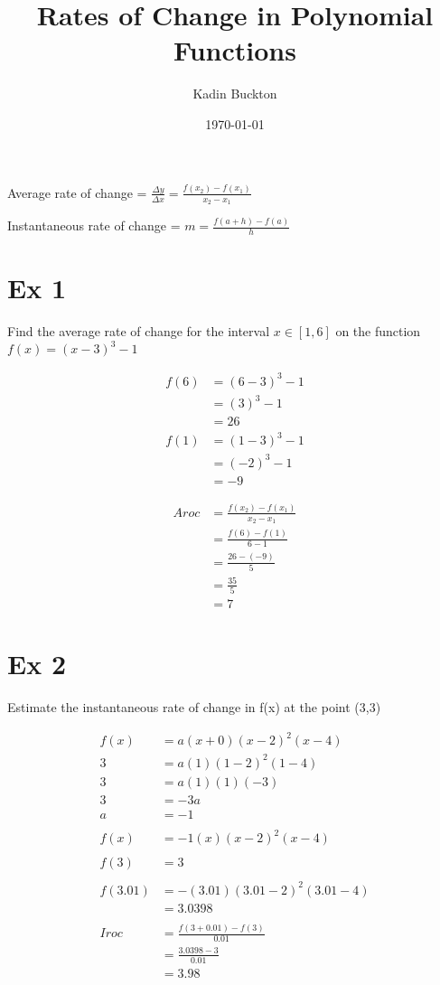 \documentclass[11pt]{article}
\author{Kadin Buckton}
\date{\today}
\title{Rates of Change in Polynomial Functions}
\begin{document}
\maketitle
Average rate of change = \(\frac{\Delta y}{\Delta x} = \frac{f(x_2)-f(x_1)}{x_2-x_1}\)

Instantaneous rate of change = \(m = \frac{f(a+h)-f(a)}{h}\)
\section*{Ex 1}
\label{sec:org9ae3475}

Find the average rate of change for the interval \(x \in [1,6]\) on the function \(f(x) = (x-3)^3-1\)

\begin{align*}
f(6) &= (6-3)^3-1\\
&=(3)^3-1\\
&=26\\
f(1) &= (1-3)^3-1\\
&= (-2)^3-1\\
&=-9
\end{align*}

\begin{align*}
Aroc &= \frac{f(x_2)-f(x_1)}{x_2-x_1}\\
&= \frac{f(6) - f(1)}{6-1}\\
&= \frac{26 - (-9)}{5}\\
&= \frac{35}{5}\\
&= 7
\end{align*}

\section*{Ex 2}
\label{sec:org68dca0f}

Estimate the instantaneous rate of change in f(x) at the point (3,3)


\begin{align*}
f(x) &= a(x+0)(x-2)^2(x-4)\\
3 &= a(1)(1-2)^2(1-4)\\
3 &= a(1)(1)(-3)\\
3 &= -3a\\
a &= -1\\
\\
f(x) &= -1(x)(x-2)^2(x-4)\\
\\
f(3) &= 3\\
\\
f(3.01) &= -(3.01)(3.01-2)^2(3.01-4)\\
&= 3.0398\\
\\
Iroc &= \frac{f(3+0.01)-f(3)}{0.01}\\
&= \frac{3.0398-3}{0.01}\\
&= 3.98
\end{align*}
\end{document}
